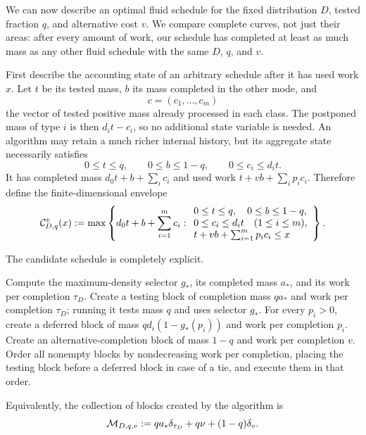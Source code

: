 We can now describe an optimal fluid schedule for the fixed distribution
$D$, tested fraction $q$, and alternative cost $v$.  We compare complete
curves, not just their areas: after every amount of work, our schedule has
completed at least as much mass as any other fluid schedule with the same
$D$, $q$, and $v$.

First describe the accounting state of an arbitrary schedule after it has
used work $x$.  Let $t$ be its tested mass, $b$ its mass completed in the
other mode, and
\[
 c=(c_1,\ldots,c_m)
\]
the vector of tested positive mass already processed in each class.  The
postponed mass of type $i$ is then $d_it-c_i$, so no additional state
variable is needed.  An algorithm may retain a much richer internal history,
but its aggregate state necessarily satisfies
\[
 0\le t\le q,\qquad 0\le b\le1-q,\qquad 0\le c_i\le d_it.
\]
It has completed mass $d_0t+b+\sum_i c_i$ and used work
$t+vb+\sum_i p_ic_i$.  Therefore define the finite-dimensional envelope
\begin{equation}
 \mathcal C^v_{D,q}(x)\mathrel{:=}
 \max\left\{
 d_0t+b+\sum_{i=1}^m c_i:
 \begin{array}{l}
 0\le t\le q,\quad 0\le b\le1-q,\\
 0\le c_i\le d_it\quad(1\le i\le m),\\
 t+vb+\sum_{i=1}^m p_ic_i\le x
 \end{array}
 \right\}.
 \label{eq:common-fluid-envelope}
\end{equation}

The candidate schedule is completely explicit.

\begin{algorithm}[H]
\caption{}
\label{alg:fluid-spt}
\begin{algorithmic}
\State Compute the maximum-density selector $g_*$, its completed mass $a_*$,
and its work per completion $\tau_D$.
\State Create a testing block of completion mass $qa_*$ and work per
completion $\tau_D$; running it tests mass $q$ and uses selector $g_*$.
\State For every $p_i>0$, create a deferred block of mass
$qd_i(1-g_*(p_i))$ and work per completion $p_i$.
\State Create an alternative-completion block of mass $1-q$ and work per
completion $v$.
\State Order all nonempty blocks by nondecreasing work per completion,
placing the testing block before a deferred block in case of a tie, and
execute them in that order.
\end{algorithmic}
\end{algorithm}

Equivalently, the collection of blocks created by the algorithm is
\begin{equation}
 \mathcal M_{D,q,v}\mathrel{:=}
 qa_*\delta_{\tau_D}+q\nu+(1-q)\delta_v.
 \label{eq:common-envelope-items}
\end{equation}

